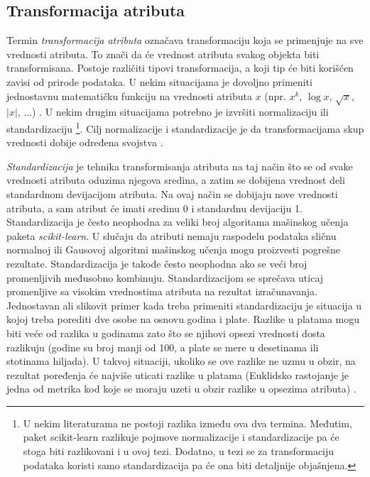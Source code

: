 \documentclass[12pt,oneside]{memoir}
\begin{document}
\subsection{Transformacija atributa}

Termin \textit{transformacija atributa} označava transformaciju koja se primenjuje na sve vrednosti atributa. To znači da će vrednost atributa svakog objekta biti transformisana. Postoje različiti tipovi transformacija, a koji tip će biti korišćen zavisi od prirode podataka. U nekim situacijama je dovoljno primeniti jednostavnu matematičku funkciju na vrednosti atributa $x$ (npr. $x^k$, $\log x$, $\sqrt{x}$, $\left| x \right|$, ...) . U nekim drugim situacijama potrebno je izvršiti normalizaciju ili standardizaciju \footnote{U nekim literaturama ne postoji razlika između ova dva termina. Međutim, paket scikit-learn razlikuje pojmove normalizacije i standardizacije pa će stoga biti razlikovani i u ovoj tezi. Dodatno, u tezi se za transformaciju podataka koristi samo standardizacija pa će ona biti detaljnije objašnjena.}. Cilj normalizacije i standardizacije je da transformacijama skup vrednosti dobije određena svojstva \cite{mitic}.  

\textit{Standardizacija} je tehnika transformisanja atributa na taj način što se od svake vrednosti atributa oduzima njegova sredina, a zatim se dobijena vrednost deli standardnom devijacijom atributa. Na ovaj način se dobijaju nove vrednosti atributa, a sam atribut će imati sredinu 0 i standardnu devijaciju 1. Standardizacija je često neophodna za veliki broj algoritama mašinskog učenja paketa \textit{scikit-learn}. U slučaju da atributi nemaju raspodelu podataka sličnu normalnoj ili Gausovoj algoritmi mašinskog učenja mogu proizvesti pogrešne rezultate. Standardizacija je takođe često neophodna ako se veći broj promenljivih međusobno kombinuju. Standardizacijom se sprečava uticaj promenljive sa visokim vrednostima atributa na rezultat izračunavanja. Jednostavan ali slikovit primer kada treba primeniti standardizaciju je situacija u kojoj treba porediti dve osobe na osnovu godina i plate. Razlike u platama mogu biti veće od razlika u godinama zato što se njihovi opsezi vrednosti dosta razlikuju (godine su broj manji od 100, a plate se mere u desetinama ili stotinama hiljada). U takvoj situaciji, ukoliko se ove razlike ne uzmu u obzir, na rezultat poređenja će najviše uticati razlike u platama (Euklidsko rastojanje je jedna od metrika kod koje se moraju uzeti u obzir razlike u opsezima atributa) \cite{ sklearn_preprocessing, mlm2, mitic}. 
\end{document}
